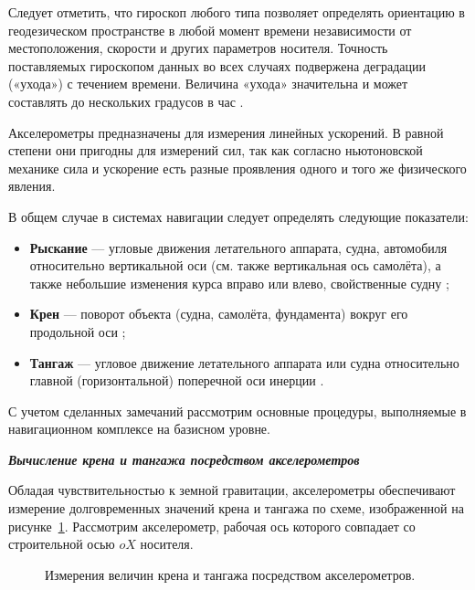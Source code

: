 Следует отметить, что гироскоп любого типа позволяет определять ориентацию в геодезическом пространстве в любой момент времени независимости от местоположения, скорости и других параметров носителя. Точность поставляемых гироскопом данных во всех случаях подвержена деградации («ухода») с течением времени. Величина «ухода» значительна и может составлять до нескольких градусов в час \cite{laserLocation}.

Акселерометры предназначены для измерения линейных ускорений. В равной степени они пригодны для измерений сил, так как согласно ньютоновской механике сила и ускорение есть разные проявления одного и того же физического явления.

В общем случае в системах навигации следует определять следующие показатели:
\begin{itemize}
\item \textbf{Рыскание} — угловые движения летательного аппарата, судна, автомобиля относительно вертикальной оси (см. также вертикальная ось самолёта), а также небольшие изменения курса вправо или влево, свойственные судну \cite{wikiRiskanie};
\item \textbf{Крен} — поворот объекта (судна, самолёта, фундамента) вокруг его продольной оси \cite{wikiKren};
\item \textbf{Тангаж} — угловое движение летательного аппарата или судна относительно главной (горизонтальной) поперечной оси инерции \cite{wikiTangazh}.

\end{itemize}
С учетом сделанных замечаний рассмотрим основные процедуры, выполняемые в навигационном комплексе на базисном уровне.

\textit{\textbf{Вычисление крена и тангажа посредством акселерометров}}

Обладая чувствительностью к земной гравитации, акселерометры обеспечивают измерение долговременных значений крена и тангажа по схеме, изображенной на рисунке~\ref{pic:tangazh}. Рассмотрим акселерометр, рабочая ось которого совпадает со строительной осью $oX$ носителя.

\begin{figure}[!htb]
\caption{Измерения величин крена и тангажа посредством акселерометров.}
\label{pic:tangazh}
\end{figure}

